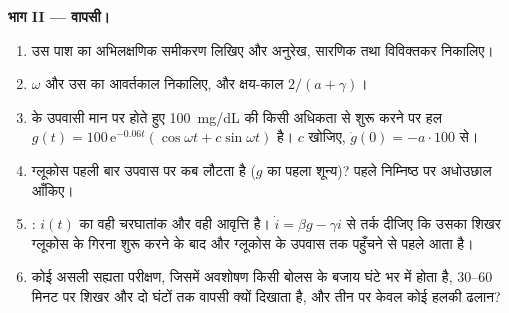 \begin{problem}
\medskip
\noindent\textbf{भाग II --- वापसी।}
\begin{enumerate}[resume]
  \item उस पाश का अभिलक्षणिक समीकरण लिखिए और अनुरेख, सारणिक तथा
        विविक्तकर निकालिए।
  \item $\omega$ और उस  का आवर्तकाल निकालिए, और क्षय-काल
        $2/(a + \gamma)$।
  \item {} के उपवासी मान पर होते हुए \qty{100}{mg/dL} की किसी
        अधिकता से शुरू करने पर हल $g(t) = 100\,\mathrm{e}^{-0.06t}
        (\cos\omega t + c\sin\omega t)$ है। $c$ खोजिए, $\dot g(0) = -a\cdot
        100$ से।
  \item ग्लूकोस पहली बार उपवास पर कब लौटता है ($g$ का पहला शून्य)?
        पहले निम्निष्ठ पर अधोउछाल आँकिए।
  \item {}: $i(t)$ का वही चरघातांक और वही आवृत्ति है।
        $\dot i = \beta g - \gamma i$ से तर्क दीजिए कि उसका शिखर
        ग्लूकोस के गिरना शुरू करने के बाद और ग्लूकोस के उपवास तक
        पहुँचने से पहले आता है।
  \item कोई असली सह्यता परीक्षण, जिसमें अवशोषण किसी बोलस के बजाय घंटे
        भर में होता है, 30--60 मिनट पर शिखर और दो घंटों तक वापसी क्यों
        दिखाता है, और तीन पर केवल कोई हलकी ढलान?
\end{enumerate}


\end{problem}
